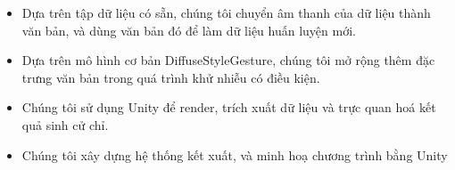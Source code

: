 \begin{itemize}
	\item Dựa trên tập dữ liệu có sẵn, chúng tôi chuyển âm thanh của dữ liệu thành văn bản, và dùng văn bản đó để làm dữ liệu huấn luyện mới.
	
	
	\item Dựa trên mô hình cơ bản DiffuseStyleGesture, chúng tôi mở rộng thêm đặc trưng văn bản trong quá trình khử nhiễu có điều kiện.
	
	\item Chúng tôi sử dụng Unity để render, trích xuất dữ liệu và trực quan hoá kết quả sinh cử chỉ.
	
	\item Chúng tôi xây dựng hệ thống kết xuất, và minh hoạ chương trình bằng Unity
	
	
	
	
%	
\end{itemize}



